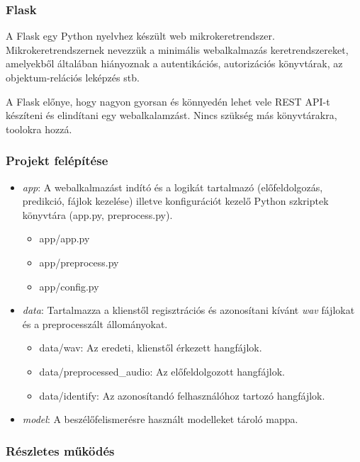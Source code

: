 \subsubsection{Flask}

A Flask egy Python nyelvhez készült web mikrokeretrendszer. Mikrokeretrendszernek nevezzük a minimális webalkalmazás keretrendszereket, amelyekből általában hiányoznak a autentikációs, autorizációs könyvtárak, az objektum-relációs leképzés stb.

A Flask előnye, hogy nagyon gyorsan és könnyedén lehet vele REST API-t készíteni és elindítani egy webalkalamzást. Nincs szükség más könyvtárakra, toolokra hozzá.

\subsubsection{Projekt felépítése}

\begin{itemize}
	\item \emph{app}: A webalkalmazást indító és a logikát tartalmazó (előfeldolgozás, predikció, fájlok kezelése) illetve konfigurációt kezelő Python szkriptek könyvtára (app.py, preprocess.py).
	
	\begin{itemize}
		\item app/app.py
		\item app/preprocess.py
		\item app/config.py
	\end{itemize}
	
	\item \emph{data}: Tartalmazza a klienstől regisztrációs és azonosítani kívánt \emph{wav} fájlokat és a preprocesszált állományokat.
	
	\begin{itemize}
		\item data/wav: Az eredeti, klienstől érkezett hangfájlok.
		\item data/preprocessed\_audio: Az előfeldolgozott hangfájlok. 
		\item data/identify: Az azonosítandó felhasználóhoz tartozó hangfájlok.
	\end{itemize}
	
	\item \emph{model}: A beszélőfelismerésre használt modelleket tároló mappa.
\end{itemize}

\subsubsection{Részletes működés}

